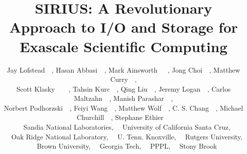 \documentclass[letterpaper,twocolumn,10pt]{article}
\begin{document}
\date{}

\title{\Large \bf SIRIUS: A Revolutionary Approach to I/O and Storage for Exascale Scientific Computing}

\author{
Jay Lofstead\footnotemark[1]~~,
Hasan Abbasi\footnotemark[3]~~,
Mark Ainsworth\footnotemark[6]~\footnotemark[3]~~,
Jong Choi\footnotemark[3]~~,
Matthew Curry\footnotemark[1]~~,\\
Scott Klasky\footnotemark[3]~\footnotemark[4]~\footnotemark[7]~~,
Tahsin Kurc\footnotemark[9]~~,
Qing Liu\footnotemark[3]~~,
Jeremy Logan\footnotemark[4]~~,
Carlos Maltzahn\footnotemark[2]~~,
Manish Parashar\footnotemark[5]~~,\\
Norbert Podhorzski\footnotemark[3]~~,
Feiyi Wang\footnotemark[3]~~,
Matthew Wolf\footnotemark[7]~~,
C. S. Chang\footnotemark[8]~~,
Michael Churchill\footnotemark[8]~~,
Stephane Ethier\footnotemark[8]~~
\\
\footnotemark[1]~~Sandia National Laboratories,
\footnotemark[2]~~University of California Santa Cruz,\\
\footnotemark[3]~~Oak Ridge National Laboratory,
\footnotemark[4]~~U. Tenn. Knoxville,
\footnotemark[5]~~Rutgers University,\\
\footnotemark[6]~~Brown University,
\footnotemark[7]~~Georgia Tech,
\footnotemark[8]~~PPPL,
\footnotemark[9]~~Stony Brook
}

\maketitle

\thispagestyle{empty}
\end{document}
